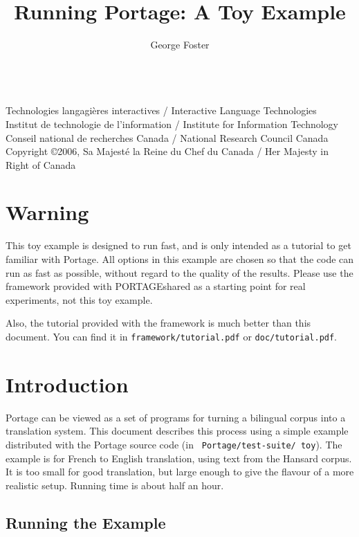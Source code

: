 \documentclass[11pt]{article}
\title{Running Portage: A Toy Example}
\date{}
\author{George Foster}
\begin{document}
\maketitle

\begin{center}
{~} \\ \tiny
   Technologies langagi{\`e}res interactives /
      Interactive Language Technologies \\
   Institut de technologie de l'information /
      Institute for Information Technology \\
   Conseil national de recherches Canada /
      National Research Council Canada \\
   Copyright \copyright 2006, Sa Majest{\'e} la Reine du Chef du Canada /
      Her Majesty in Right of Canada
\end{center}

\section{Warning}

This toy example is designed to run fast, and is only intended as a tutorial to
get familiar with Portage.  All options in this example are chosen so that the
code can run as fast as possible, without regard to the quality of the results.
Please use the framework provided with PORTAGEshared as a starting point for
real experiments, not this toy example.

Also, the tutorial provided with the framework is much better than this
document.  You can find it in {\tt framework/tutorial.pdf} or
{\tt doc/tutorial.pdf}.

\section{Introduction}

Portage can be viewed as a set of programs for turning a bilingual corpus into
a translation system. This document describes this process using a simple
example distributed with the Portage source code (in {\tt
  Portage/test-suite/ toy}). The example is for French to English translation,
using text from the Hansard corpus. It is too small for good translation, but
large enough to give the flavour of a more realistic setup. Running time is
about half an hour.

\subsection{Running the Example}
\end{document}
